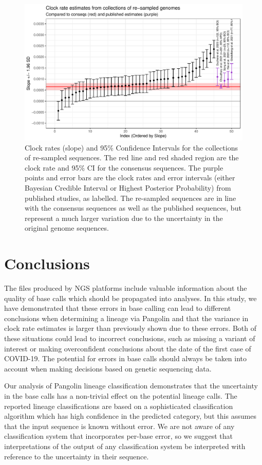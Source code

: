 \documentclass[12pt]{article}
\begin{document}
\begin{figure}[btp]
\centering
\includegraphics[width=0.85\linewidth]{figs/RTT_Slope.pdf}
\caption{\label{fig:RTT_slope}Clock rates (slope) and 95\% Confidence Intervals for the collections of re-sampled sequences.
The red line and red shaded region are the clock rate and 95\% CI for the consensus sequences.
The purple points and error bars are the clock rates and error intervals (either Bayesian Credible Interval or Highest Posterior Probability) from published studies, as labelled.
The re-sampled sequences are in line with the consensus sequences as well as the published sequences, but represent a much larger variation due to the uncertainty in the original genome sequences.}
\end{figure}


\section{Conclusions}

The files produced by NGS platforms include valuable information about the quality of base calls which should be propagated into analyses.
In this study, we have demonstrated that these errors in base calling can lead to different conclusions when determining a lineage via Pangolin and that the variance in clock rate estimates is larger than previously shown due to these errors.
Both of these situations could lead to incorrect conclusions, such as missing a variant of interest or making overconfident conclusions about the date of the first case of COVID-19.
The potential for errors in base calls should always be taken into account when making decisions based on genetic sequencing data.

Our analysis of Pangolin lineage classification demonstrates that the uncertainty in the base calls has a non-trivial effect on the potential lineage calls.
The reported lineage classifications are based on a sophisticated classification algorithm which has high confidence in the predicted category, but this assumes that the input sequence is known without error.
We are not aware of any classification system that incorporates per-base error, so we suggest that interpretations of the output of any classification system be interpreted with reference to the uncertainty in their sequence.
\end{document}
